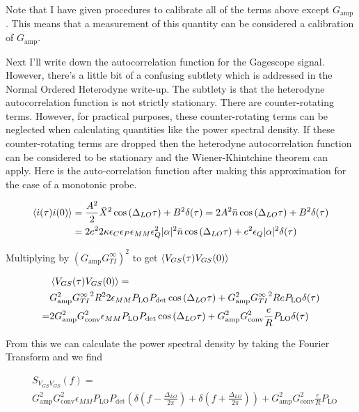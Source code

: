 \documentclass[12pt]{article}
\begin{document}
Note that I have given procedures to calibrate all of the terms above except $G_{\text{amp}}$. This means that a measurement of this quantity can be considered a calibration of $G_{\text{amp}}$.

Next I'll write down the autocorrelation function for the Gagescope signal. However, there's a little bit of a confusing subtlety which is addressed in the Normal Ordered Heterodyne write-up. The subtlety is that the heterodyne autocorrelation function is not strictly stationary. There are counter-rotating terms. However, for practical purposes, these counter-rotating terms can be neglected when calculating quantities like the power spectral density. If these counter-rotating terms are dropped then the heterodyne autocorrelation function can be considered to be stationary and the Wiener-Khintchine theorem can apply. Here is the auto-correlation function after making this approximation for the case of a monotonic probe.

\begin{align}
\Braket{i(\tau)i(0)} &= \frac{A^2}{2} \bar{X}^2 \cos\left(\Delta_{LO}\tau\right) + B^2 \delta(\tau) =2A^2\bar{n}\cos\left(\Delta_{LO}\tau\right) + B^2 \delta(\tau)\\
&= 2 e^2 2\kappa \epsilon_C \epsilon_P \epsilon_{MM} \epsilon_Q^2 \lvert \alpha \rvert^2 \bar{n}\cos\left(\Delta_{LO}\tau\right) + e^2 \epsilon_Q \lvert \alpha \rvert^2 \delta(\tau)
\end{align}

Multiplying by $\left(G_{\text{amp}}G_{TI}^{\infty}\right)^2$ to get $\Braket{V_{GS}(\tau)V_{GS}(0)}$

\begin{align}
&\Braket{V_{GS}(\tau)V_{GS}(0)} =\\
& G_{\text{amp}}^2 {G_{TI}^{\infty}}^2 R^2 2 \epsilon_{MM} P_{\text{LO}}P_{\text{det}}\cos\left(\Delta_{LO}\tau\right) + G_{\text{amp}}^2 {G_{TI}^{\infty}}^2 R e P_{\text{LO}}\delta(\tau)\\
=&2G_{\text{amp}}^2G_{\text{conv}}^2 \epsilon_{MM} P_{\text{LO}}P_{\text{det}} \cos\left(\Delta_{LO}\tau\right) + G_{\text{amp}}^2G_{\text{conv}}^2\frac{e}{R}P_{\text{LO}}\delta(\tau)
\end{align}

From this we can calculate the power spectral density by taking the Fourier Transform and we find

\begin{align}
&S_{V_{GS}V_{GS}}(f) =\\
&G_{\text{amp}}^2G_{\text{conv}}^2 \epsilon_{MM} P_{\text{LO}}P_{\text{det}} \left(\delta\left(f-\frac{\Delta_{LO}}{2\pi}\right) + \delta\left(f+\frac{\Delta_{LO}}{2\pi}\right)\right) + G_{\text{amp}}^2G_{\text{conv}}^2\frac{e}{R}P_{\text{LO}}
\end{align}
\end{document}
